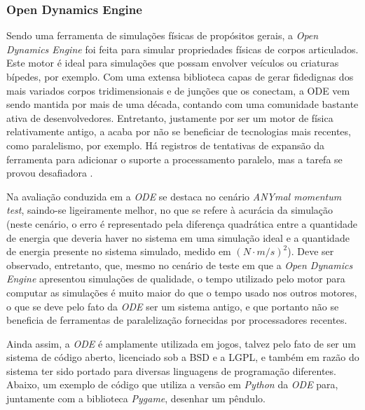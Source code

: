 \documentclass[cic,tc]{iiufrgs}
\begin{document}
\subsubsection{Open Dynamics Engine}

Sendo uma ferramenta de simulações físicas de propósitos gerais, a
\textit{Open Dynamics Engine} \cite{ODE} foi feita para simular propriedades
físicas de corpos articulados. Este motor é ideal para simulações que possam
envolver veículos ou criaturas bípedes, por exemplo. Com uma extensa biblioteca
capas de gerar fidedignas dos mais variados corpos tridimensionais e de junções
que os conectam, a ODE vem sendo mantida por mais de uma década, contando com
uma comunidade bastante ativa de desenvolvedores. Entretanto, justamente por
ser um motor de física relativamente antigo, a  acaba por não se
beneficiar de tecnologias mais recentes, como paralelismo, por exemplo. Há
registros de tentativas de expansão da ferramenta para adicionar o suporte a
processamento paralelo, mas a tarefa se provou desafiadora \cite{ODEParallel}.

Na avaliação conduzida em \cite{LeggedRobotics2018} a \textit{ODE} se destaca no
cenário \textit{ANYmal momentum test}, saindo-se ligeiramente melhor, no que se
refere à acurácia da simulação (neste cenário, o erro é representado pela
diferença quadrática entre a quantidade de energia que deveria haver no sistema
em uma simulação ideal e a quantidade de energia presente no sistema simulado,
medido em $(N \cdot m/s)^2$). Deve ser observado, entretanto, que, mesmo no
cenário de teste em que a \textit{Open Dynamics Engine} apresentou simulações de
qualidade, o tempo utilizado pelo motor para computar as simulações é muito
maior do que o tempo usado nos outros motores, o que se deve pelo fato da
\textit{ODE} ser um sistema antigo, e que portanto não se beneficia de
ferramentas de paralelização fornecidas por processadores recentes.


Ainda assim, a \textit{ODE} é amplamente utilizada em jogos, talvez pelo fato de
ser um sistema de código aberto, licenciado sob a BSD e a LGPL, e também em
razão do sistema ter sido portado para diversas linguagens de programação
diferentes. Abaixo, um exemplo de código que utiliza a versão em \textit{Python}
da \textit{ODE} para, juntamente com a biblioteca \textit{Pygame}, desenhar um
pêndulo.
\end{document}
